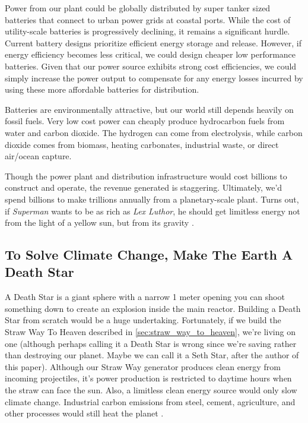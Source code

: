\documentclass{article}
\begin{document}
Power from our plant could be globally distributed by super tanker sized batteries that connect to urban power grids at coastal ports.  While the cost of utility-scale batteries is progressively declining, it remains a significant hurdle. Current battery designs prioritize efficient energy storage and release. However, if energy efficiency becomes less critical, we could design cheaper low performance batteries. Given that our power source exhibits strong cost efficiencies, we could simply increase the power output to compensate for any energy losses incurred by using these more affordable batteries for distribution. 

Batteries are environmentally attractive, but our world still depends heavily on fossil fuels.  Very low cost power can cheaply produce hydrocarbon fuels from water and carbon dioxide.  The hydrogen can come from electrolysis, while carbon dioxide comes from biomass, heating carbonates, industrial waste, or direct air/ocean capture.

Though the power plant and distribution infrastructure would cost billions to construct and operate, the revenue generated is staggering. Ultimately, we'd spend billions to make trillions annually from a planetary-scale plant.  Turns out, if  \textit{Superman} wants to be as rich as \textit{Lex Luthor}, he should get limitless energy not from the light of a yellow sun, but from its gravity \cite{superman2025}.

\subsection{To Solve Climate Change, Make The Earth A Death Star}\label{sec:death_star}
A Death Star \cite{death_star} is a giant sphere with a  narrow 1 meter opening you can shoot something down to create an explosion inside the main reactor.   Building a Death Star from scratch  would be a huge undertaking.   Fortunately, if we build the Straw Way To Heaven described in \autoref{sec:straw_way_to_heaven}, we're living on one (although perhaps calling it a Death Star is wrong since we're saving rather than destroying our planet.  Maybe we can call it a Seth Star, after the author of this paper).  Although our Straw Way generator produces clean energy from incoming projectiles, it's power production is restricted to daytime hours when the straw can face the sun.   Also, a limitless clean energy source would only slow climate change.   Industrial carbon emissions from steel, cement, agriculture, and other processes would still heat the planet \cite{steel_and_cement}.   
\end{document}
